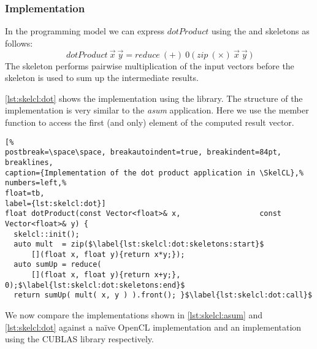 \subsubsection*{\SkelCL Implementation}
In the \SkelCL programming model we can express $dotProduct$ using the \zip and \reduce skeletons as follows:
\begin{equation}
  dotProduct\ \vec{x}\ \vec{y} = reduce\ (+)\ 0\ \big(\ zip\ (\times)\ \vec{x}\ \vec{y}\ \big)
  \label{eq:skelcl:dot_product}
\end{equation}
The \zip skeleton performs pairwise multiplication of the input vectors before the \reduce skeleton is used to sum up the intermediate results.

\autoref{lst:skelcl:dot} shows the implementation using the \SkelCL library.
The structure of the implementation is very similar to the \emph{asum} application.
Here we use the  member function to access the first (and only) element of the computed result vector.

\begin{lstlisting}[%                                                             
postbreak=\space\space, breakautoindent=true, breakindent=84pt, breaklines,
caption={Implementation of the dot product application in \SkelCL},%
numbers=left,%
float=tb,
label={lst:skelcl:dot}]
float dotProduct(const Vector<float>& x,                  const Vector<float>& y) {
  skelcl::init();
  auto mult  = zip($\label{lst:skelcl:dot:skeletons:start}$
      [](float x, float y){return x*y;});
  auto sumUp = reduce(
      [](float x, float y){return x+y;}, 0);$\label{lst:skelcl:dot:skeletons:end}$
  return sumUp( mult( x, y ) ).front(); }$\label{lst:skelcl:dot:call}$
\end{lstlisting}





\bigskip

We now compare the \SkelCL implementations shown in \autoref{lst:skelcl:asum} and \autoref{lst:skelcl:dot} against a na{\"i}ve OpenCL implementation and an implementation using the CUBLAS library respectively.


